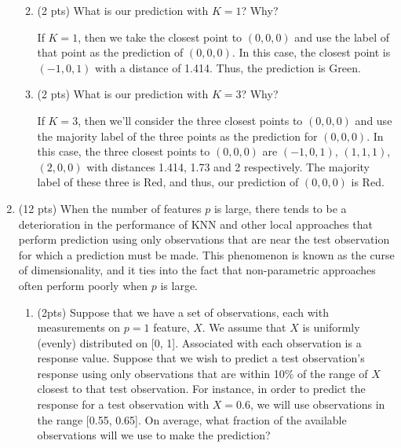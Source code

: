 \documentclass[a4paper]{article}
\theoremstyle{definition}
\newenvironment{soln}{
    \leavevmode\color{blue}\ignorespaces
}{}
\begin{document}
\begin{enumerate}
\begin{enumerate}
\begin{soln}
    
    \end{soln}
 
	\item (2 pts) What is our prediction with $K=1$? Why?
	
	\begin{soln}  If $K=1$, then we take the closest point to $(0,0,0)$ and use the label of that point as the prediction of $(0,0,0)$. In this case, the closest point is $(-1,0,1)$ with a distance of 1.414. Thus, the prediction is Green. \end{soln}
	
	\item (2 pts) What is our prediction with $K=3$? Why?
	
	\begin{soln}  If $K=3$, then we'll consider the three closest points to $(0,0,0)$ and use the majority label of the three points as the prediction for $(0,0,0)$. In this case, the three closest points to $(0,0,0)$ are $(-1,0,1)$, $(1,1,1)$, $(2,0,0)$ with distances 1.414, 1.73 and 2 respectively. The majority label of these three is Red, and thus, our prediction of $(0,0,0)$ is Red.\end{soln}

\end{enumerate}

\item (12 pts) When the number of features $p$ is large, there tends to be a deterioration in the performance of KNN and other local approaches that perform prediction using only observations that are near the test observation for which a prediction must be made. This phenomenon is known as the curse of dimensionality, and it ties into the fact that non-parametric approaches often perform poorly when $p$ is large.

\begin{enumerate}
	\item (2pts) Suppose that we have a set of observations, each with measurements on $p=1$ feature, $X$. We assume that $X$ is uniformly (evenly) distributed on [0, 1]. Associated with each observation is a response value. Suppose that we wish to predict a test observation’s response using only observations that are within 10\% of the range of $X$ closest to that test observation. For instance, in order to predict the response for a test observation with $X=0.6$, we will use observations in the range [0.55, 0.65]. On average, what fraction of the available observations will we use to make the prediction?
	

\end{enumerate}
\end{enumerate}
\end{document}
